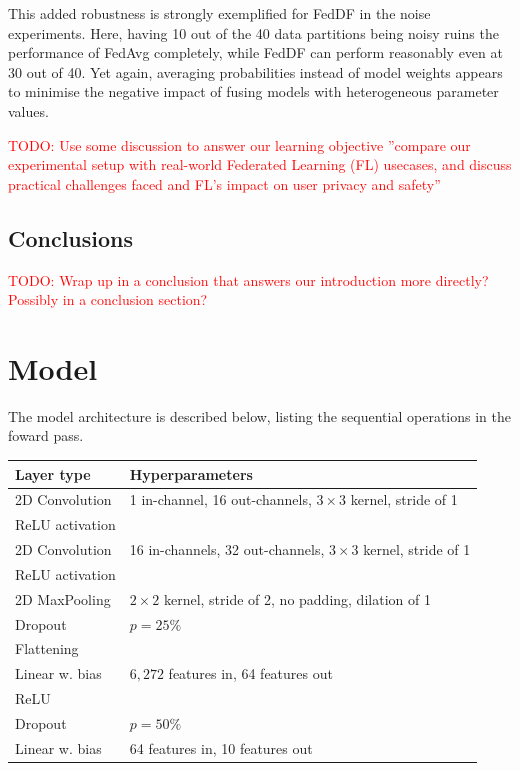 \documentclass{article}
\begin{document}
This added robustness is strongly exemplified for FedDF in the noise experiments.
Here, having 10 out of the 40 data partitions being noisy ruins the performance of FedAvg completely, while FedDF can perform reasonably even at 30 out of 40.
Yet again, averaging probabilities instead of model weights appears to minimise the negative impact of fusing models with heterogeneous parameter values.

\textcolor{red}{
TODO: Use some discussion to answer our learning objective ''compare our experimental setup with real-world Federated Learning (FL) usecases, and discuss practical challenges faced and FL's impact on user privacy and safety''
}

\subsection{Conclusions}
\textcolor{red}{
TODO: Wrap up in a conclusion that answers our introduction more directly? Possibly in a conclusion section?
}

\vfill
\pagebreak




\appendix
\section{Model}
\label{app:model}
The model architecture is described below, listing the sequential operations in the foward pass.
\begin{table}[htb!]
    \centering
    \begin{tabular}{l|p{5cm}}
            Layer type & Hyperparameters\\
            \hline
            2D Convolution & 1 in-channel, 16 out-channels, $3\times 3$ kernel, stride of 1\\
            ReLU activation\\
            2D Convolution & 16 in-channels, 32 out-channels, $3\times 3$ kernel, stride of 1\\
            ReLU activation\\
            2D MaxPooling & $2\times 2$ kernel, stride of 2, no padding, dilation of 1\\
            Dropout & $p=25\%$\\
            Flattening\\
            Linear w. bias & $6,272$ features in, 64 features out\\
            ReLU \\
            Dropout & $p=50\%$\\
            Linear w. bias & 64 features in, 10 features out
        \end{tabular}
\end{table}\noindent
\end{document}

